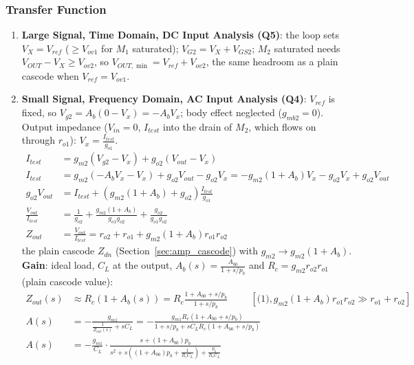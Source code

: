 \subsubsection{Transfer Function}
\begin{enumerate}
  \item \textbf{Large Signal, Time Domain, DC Input Analysis (Q5)}:
    the loop sets \(V_X = V_{ref}\) (\(\geq V_{ov1}\) for \(M_1\) saturated);
    \(V_{G2} = V_X + V_{GS2}\); \(M_2\) saturated needs \(V_{OUT} - V_X \geq V_{ov2}\), so
    \(V_{OUT,\min} = V_{ref} + V_{ov2}\), the same headroom as a plain cascode
    when \(V_{ref} = V_{ov1}\).
  \item \textbf{Small Signal, Frequency Domain, AC Input Analysis (Q4)}:
    \(V_{ref}\) is fixed, so \(V_{g2} = A_b(0 - V_x) = -A_b V_x\); body effect
    neglected (\(g_{mb2} = 0\)). Output impedance (\(V_{in} = 0\), \(I_{test}\) into the
    drain of \(M_2\), which flows on through \(r_{o1}\)): \(V_x = \frac{I_{test}}{g_{o1}}\).
    \begin{align*}
      I_{test} &= g_{m2}(V_{g2} - V_x) + g_{o2}(V_{out} - V_x) \\
      I_{test} &= g_{m2}(-A_b V_x - V_x) + g_{o2} V_{out} - g_{o2} V_x = -g_{m2}(1 + A_b) V_x - g_{o2} V_x + g_{o2} V_{out} \\
      g_{o2} V_{out} &= I_{test} + \left(g_{m2}(1 + A_b) + g_{o2}\right)\frac{I_{test}}{g_{o1}} \\
      \frac{V_{out}}{I_{test}} &= \frac{1}{g_{o2}} + \frac{g_{m2}(1 + A_b)}{g_{o1} g_{o2}} + \frac{g_{o2}}{g_{o1} g_{o2}} \\
      Z_{out} &= \frac{V_{out}}{I_{test}} = r_{o2} + r_{o1} + g_{m2}(1 + A_b) r_{o1} r_{o2} \tag{1}
    \end{align*}
    the plain cascode \(Z_{dn}\) (Section~\ref{sec:amp_cascode}) with \(g_{m2} \to g_{m2}(1 + A_b)\).\\
    \textbf{Gain}: ideal load, \(C_L\) at the output, \(A_b(s) = \frac{A_{b0}}{1 + s/p_b}\) and
    \(R_c = g_{m2} r_{o2} r_{o1}\) (plain cascode value):
    \begin{align*}
      Z_{out}(s) &\approx R_c (1 + A_b(s)) = R_c \frac{1 + A_{b0} + s/p_b}{1 + s/p_b} \hspace{1cm} [\text{(1)}, g_{m2}(1 + A_b) r_{o1} r_{o2} \gg r_{o1} + r_{o2}] \\
      A(s) &= -\frac{g_{m1}}{\frac{1}{Z_{out}(s)} + sC_L} = -\frac{g_{m1} R_c (1 + A_{b0} + s/p_b)}{1 + s/p_b + sC_L R_c(1 + A_{b0} + s/p_b)} \\
      A(s) &= -\frac{g_{m1}}{C_L} \cdot \frac{s + (1 + A_{b0}) p_b}{s^2 + s\left((1 + A_{b0}) p_b + \frac{1}{R_c C_L}\right) + \frac{p_b}{R_c C_L}} \tag{2}
    \end{align*}
\end{enumerate}

